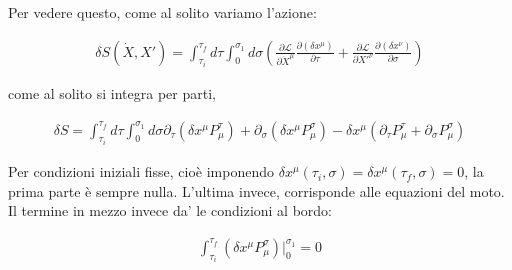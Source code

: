 \documentclass{report}
\begin{document}

Per vedere questo, come al solito variamo l'azione: 

\begin{align}
    \delta S(\dot{X}, X') = \int_{\tau_i}^{\tau_f}d\tau \int_0^{\sigma_1}d\sigma \left(\frac{\partial\mathcal{L}}{\partial \dot{X}^\mu}\frac{\partial (\delta x^\mu)}{\partial \tau} + \frac{\partial \mathcal{L}}{\partial X'^\nu}\frac{\partial (\delta x^\nu)}{\partial \sigma} \right)
\end{align}

come al solito si integra per parti, 

\begin{align}
    \delta S = \int_{\tau_i}^{\tau_f}d\tau \int_0^{\sigma_1}d\sigma \partial_\tau(\delta x^\mu P_\mu^\tau) + \partial_\sigma(\delta x^\mu P^\sigma_\mu) - \delta x^\mu(\partial_\tau P_\mu^\tau + \partial_\sigma P^\sigma_\mu)
\end{align}


Per condizioni iniziali fisse, cioè imponendo \(\delta x^\mu(\tau_i, \sigma) = \delta x^\mu (\tau_f, \sigma) = 0\), la prima parte è sempre nulla. L'ultima invece, corrisponde alle equazioni del moto. Il termine in mezzo invece da' le condizioni al bordo: 

\begin{align}
    \int_{\tau_i}^{\tau_f}(\delta x^\mu P_\mu^\sigma)|_0^{\sigma_1} =  0
\end{align}
\end{document}
